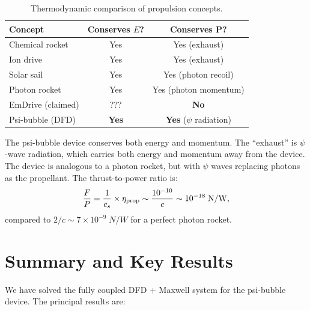 \documentclass[aps,prd,twocolumn,superscriptaddress,floatfix,nofootinbib]{revtex4-2}
\begin{document}
\begin{table}[h]
\centering
\caption{Thermodynamic comparison of propulsion concepts.}
\label{tab:thermo-comparison}
\begin{ruledtabular}
\begin{tabular}{lcc}
Concept & Conserves $E$? & Conserves $\mathbf{P}$? \\
\hline
Chemical rocket & Yes & Yes (exhaust) \\
Ion drive & Yes & Yes (exhaust) \\
Solar sail & Yes & Yes (photon recoil) \\
Photon rocket & Yes & Yes (photon momentum) \\
EmDrive (claimed) & ??? & \textbf{No} \\
Psi-bubble (DFD) & \textbf{Yes} & \textbf{Yes} ($\psi$ radiation) \\
\end{tabular}
\end{ruledtabular}
\end{table}

The psi-bubble device conserves both energy and momentum. The ``exhaust''
is $\psi$-wave radiation, which carries both energy and momentum away
from the device. The device is analogous to a photon rocket, but with
$\psi$ waves replacing photons as the propellant. The thrust-to-power
ratio is:
\begin{equation}
\frac{F}{P} = \frac{1}{c_s} \times \eta_{\rm prop}
\sim \frac{10^{-10}}{c} \sim 10^{-18}\;\si{N/W},
\label{eq:F-over-P}
\end{equation}
compared to $2/c \sim 7 \times 10^{-9}\;\si{N/W}$ for a perfect
photon rocket.


\section{Summary and Key Results}\label{sec:summary}

We have solved the fully coupled DFD + Maxwell system for the
psi-bubble device. The principal results are:
\end{document}
